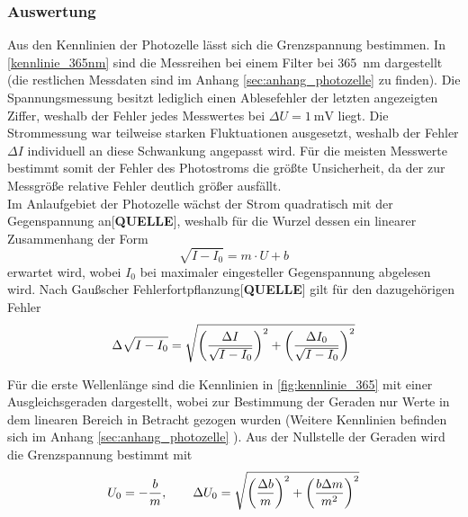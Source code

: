 \subsubsection{Auswertung}



Aus den Kennlinien der Photozelle lässt sich die Grenzspannung bestimmen. In \cref{kennlinie_365nm} sind die 
Messreihen bei einem Filter bei \SI{365}{\nano\meter} dargestellt (die restlichen Messdaten sind im Anhang 
\ref{sec:anhang_photozelle} zu finden). Die Spannungsmessung besitzt lediglich einen Ablesefehler der letzten 
angezeigten Ziffer, weshalb der Fehler jedes Messwertes bei $\Delta U = \SI{1}{\milli\volt}$ liegt.
Die Strommessung war teilweise starken Fluktuationen ausgesetzt, weshalb der Fehler $\Delta I$
individuell an diese Schwankung angepasst wird. Für die meisten Messwerte bestimmt somit der Fehler 
des Photostroms die größte Unsicherheit, da der zur Messgröße relative Fehler deutlich größer ausfällt.\\
Im Anlaufgebiet der Photozelle wächst der Strom quadratisch mit der Gegenspannung an[\textbf{QUELLE}],
weshalb für die Wurzel dessen ein linearer Zusammenhang der Form 
\begin{equation}
	\sqrt{I - I_0} = m\cdot U + b \nonumber
\end{equation}
erwartet wird, wobei $I_0$ bei maximaler eingesteller Gegenspannung abgelesen wird.
Nach Gaußscher Fehlerfortpflanzung[\textbf{QUELLE}] gilt für den dazugehörigen Fehler
\begin{equation}
	\Delta\sqrt{I - I_0} = \sqrt{\qty(\frac{\Delta I}{\sqrt{I-I_0}})^2 + \qty(\frac{\Delta I_0}{\sqrt{I-I_0}})^2} \nonumber
\end{equation}

Für die erste Wellenlänge sind die Kennlinien in \cref{fig:kennlinie_365} mit einer Ausgleichsgeraden 
dargestellt, wobei zur Bestimmung der Geraden nur Werte in dem linearen Bereich in Betracht gezogen wurden
(Weitere Kennlinien befinden sich im Anhang \ref{sec:anhang_photozelle} 
). Aus der Nullstelle der Geraden wird die Grenzspannung 
bestimmt mit 
\begin{equation}
	U_0 = - \frac{b}{m},\qquad \Delta U_0 = \sqrt{\qty(\frac{\Delta b}{m})^2 + \qty(\frac{b\Delta m}{m^2})^2}
	\label{eq:bestimmung_grenzspannung}
\end{equation}
